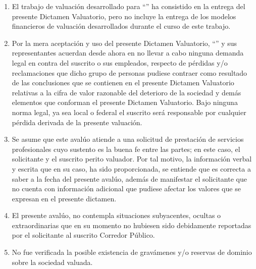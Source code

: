 \begin{enumerate}[\indent 1.]
\item El trabajo de valuación desarrollado para ``\textcolor{principal}{\empresaCorto}'' ha consistido en la entrega del presente Dictamen Valuatorio, pero no incluye la entrega de los modelos financieros de valuación desarrollados durante el curso de este trabajo.

\item Por la mera aceptación y uso del presente Dictamen Valuatorio, ``\textcolor{principal}{\empresaCorto}'' y sus representantes acuerdan desde ahora en no llevar a cabo ninguna demanda legal en contra del suscrito o sus empleados, respecto de pérdidas y/o reclamaciones que dicho grupo de personas pudiese contraer como resultado de las conclusiones que se contienen en el presente Dictamen Valuatorio relativas a la cifra de valor razonable del deterioro de la sociedad y demás elementos que conforman el presente Dictamen Valuatorio. Bajo ninguna norma legal, ya sea local o federal el suscrito será responsable por cualquier pérdida derivada de la presente valuación.

\item Se asume que este avalúo atiende a una solicitud de prestación de servicios profesionales cuyo sustento es la buena fe entre las partes; en este caso, el solicitante y el suscrito perito valuador. Por tal motivo, la información verbal y escrita que en su caso, ha sido proporcionada, se entiende que es correcta a saber a la fecha del presente avalúo, además de manifestar el solicitante que no cuenta con información adicional que pudiese afectar los valores que se expresan en el presente dictamen.

\item El presente avalúo, no contempla situaciones subyacentes, ocultas o extraordinarias que en su momento no hubiesen sido debidamente reportadas por el solicitante al suscrito Corredor Público.

\item No fue verificada la posible existencia de gravámenes y/o reservas de dominio sobre la sociedad valuada. 


\end{enumerate}